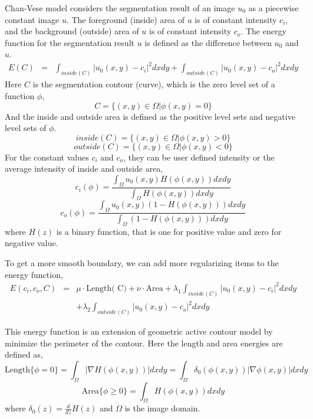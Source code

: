 Chan-Vese model considers the segmentation result of an image $u_0$  as a piecewise constant image $u$. The foreground (inside) area of $u$ is of constant intensity $c_i$, and the background (outside) area of $u$ is of constant intensity $c_o$. The energy function for the segmentation result $u$ is defined as the difference between $u_0$ and $u$.
\begin{eqnarray*}
E(C) & = &  \int_{inside( C)}|u_0(x,y) - c_i|^2dxdy + \int_{outside( C)}|u_0(x,y) - c_o|^2dxdy
\end{eqnarray*}
Here $C$ is the segmentation contour (curve), which is the zero level set of a function $\phi$,
\begin{equation}
C = \{(x,y) \in \Omega|\phi(x,y) = 0\}
\end{equation}
And the inside and outside area is defined as the positive level sets and negative level sets of $\phi$.
\begin{equation}
inside( C) = \{(x,y) \in \Omega|\phi(x,y) > 0\}
\end{equation}
\begin{equation}
outside( C) = \{(x,y) \in \Omega|\phi(x,y) < 0\}
\end{equation}
For the constant values $c_i$ and $c_o$,  they can be user defined intensity or the average intensity of inside and outside area,
\begin{equation}
c_i(\phi) = \frac{\int_{\Omega}u_0(x,y)H(\phi(x,y))dxdy}{\int_{\Omega}H(\phi(x,y))dxdy}
\end{equation}
\begin{equation}
c_o(\phi) = \frac{\int_{\Omega}u_0(x,y)(1-H(\phi(x,y)))dxdy}{\int_{\Omega}(1-H(\phi(x,y)))dxdy}
\end{equation}
where $H(z)$ is a binary function, that is one for positive value and zero for negative value.

To get a more smooth boundary, we can add more regularizing items to the energy function,
\begin{eqnarray}
\label{eqn:chanvese}
E(c_i,c_o,C) & = & \mu\cdot\mbox{Length( C)} + \nu \cdot \mbox{Area} + \lambda_1\int_{inside( C)}|u_0(x,y) - c_i|^2dxdy \\
\nonumber
& & + \lambda_2\int_{outside( C)}|u_0(x,y) - c_o|^2dxdy
\end{eqnarray}

This energy function is an extension of geometric active contour model by minimize the perimeter of the contour. Here the length and area energies are defined as, 
\begin{equation}
\mbox{Length}\{\phi = 0\} = \int_\Omega|\nabla H(\phi(x,y))|dxdy = \int_{\Omega}\delta_0(\phi(x,y))|\nabla\phi(x,y)|dxdy
\end{equation}
\begin{equation}
\mbox{Area}\{\phi \ge 0\} = \int_{\Omega}H(\phi(x,y))dxdy
\end{equation}
where $\delta_0(z) = \frac{d}{dz}H(z)$ and $\Omega$ is the image domain.

